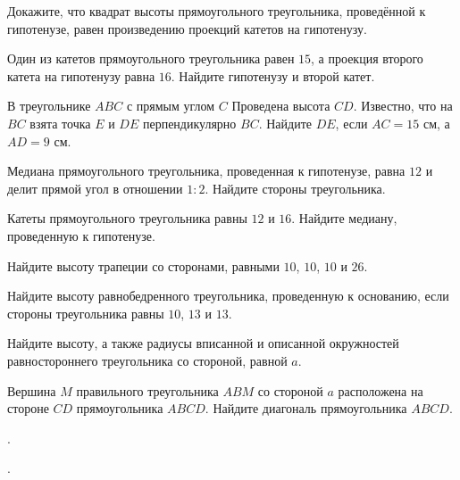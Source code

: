 \begin{class}[number=2]
	\begin{listofex}
		\item Докажите, что квадрат высоты прямоугольного треугольника, проведённой к гипотенузе, равен произведению проекций катетов на гипотенузу.
		\item Один из катетов прямоугольного треугольника равен \( 15 \), а проекция второго катета на гипотенузу равна \( 16 \). Найдите гипотенузу и второй катет.
		\item В треугольнике \( ABC \) с прямым углом \( C \) Проведена высота \( CD \). Известно, что на \( BC \) взята точка \( E \) и \( DE \) перпендикулярно \( BC \). Найдите \( DE \), если \( AC=15 \) см, а \( AD=9 \) см.	
		\item Медиана прямоугольного треугольника, проведенная к гипотенузе, равна \( 12 \) и делит прямой угол в отношении \( 1:2 \). Найдите стороны треугольника.
		\item Катеты прямоугольного треугольника равны \( 12 \) и \( 16 \). Найдите медиану, проведенную к гипотенузе.
		\item Найдите высоту трапеции со сторонами, равными \( 10 \), \( 10 \), \( 10 \) и \( 26 \).
		\item Найдите высоту равнобедренного треугольника, проведенную к основанию, если стороны треугольника равны \( 10 \), \( 13 \) и \( 13 \).
		\item Найдите высоту, а также радиусы вписанной и описанной окружностей равностороннего треугольника со стороной, равной \( a \).
		\item Вершина \( M \) правильного треугольника \( ABM \) со стороной \( a \) расположена на стороне \( CD \) прямоугольника \( ABCD \).	Найдите диагональ прямоугольника \( ABCD \).
	\end{listofex}
\end{class}

\begin{homework}[number=1]
	\begin{listofex}
		\item .
	\end{listofex}
\end{homework}

\begin{class}[number=3]
	\begin{listofex}
		\item .
	\end{listofex}
\end{class}

